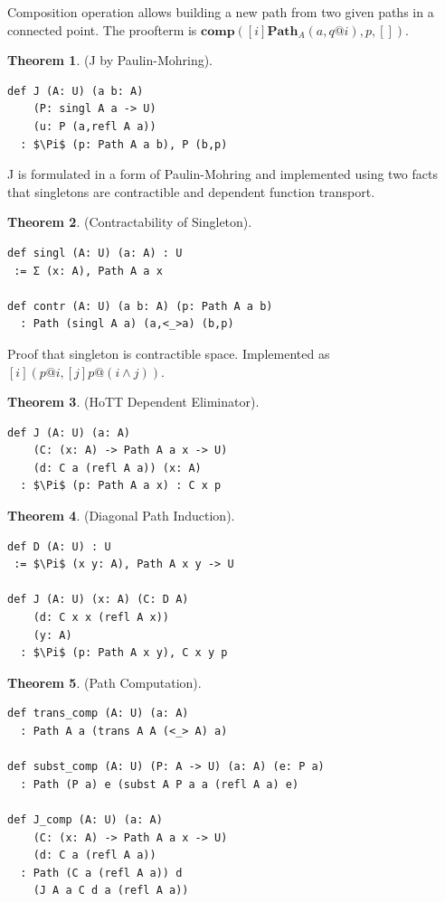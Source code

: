 \documentclass{article}
\theoremstyle{definition}
\newtheorem{theorem}{Theorem}
\begin{document}
Composition operation allows building a new path from two given paths
in a connected point. The proofterm is
$\mathbf{comp}([i] \mathbf{Path}_A(a,q@i),p,[])$.

\begin{theorem} (J by Paulin-Mohring).
\begin{lstlisting}[mathescape=true]
def J (A: U) (a b: A)
    (P: singl A a -> U)
    (u: P (a,refl A a))
  : $\Pi$ (p: Path A a b), P (b,p)
\end{lstlisting}
\end{theorem}

J is formulated in a form of Paulin-Mohring and implemented using
two facts that singletons are contractible and dependent function
transport.

\begin{theorem} (Contractability of Singleton).
\begin{lstlisting}[mathescape=true]
def singl (A: U) (a: A) : U
 := Σ (x: A), Path A a x

def contr (A: U) (a b: A) (p: Path A a b)
  : Path (singl A a) (a,<_>a) (b,p)
\end{lstlisting}
\end{theorem}

Proof that singleton is contractible space. Implemented as $[i] (p @ i, [j] p @ (i \land j))$.

\begin{theorem} (HoTT Dependent Eliminator).
\begin{lstlisting}[mathescape=true]
def J (A: U) (a: A)
    (C: (x: A) -> Path A a x -> U)
    (d: C a (refl A a)) (x: A)
  : $\Pi$ (p: Path A a x) : C x p
\end{lstlisting}
\end{theorem}

\begin{theorem} (Diagonal Path Induction).
\begin{lstlisting}[mathescape=true]
def D (A: U) : U
 := $\Pi$ (x y: A), Path A x y -> U

def J (A: U) (x: A) (C: D A)
    (d: C x x (refl A x))
    (y: A)
  : $\Pi$ (p: Path A x y), C x y p
\end{lstlisting}
\end{theorem}

\newpage
\begin{theorem} (Path Computation).
\begin{lstlisting}[mathescape=true]
def trans_comp (A: U) (a: A)
  : Path A a (trans A A (<_> A) a)

def subst_comp (A: U) (P: A -> U) (a: A) (e: P a)
  : Path (P a) e (subst A P a a (refl A a) e)

def J_comp (A: U) (a: A)
    (C: (x: A) -> Path A a x -> U)
    (d: C a (refl A a))
  : Path (C a (refl A a)) d
    (J A a C d a (refl A a))
\end{lstlisting}
\end{theorem}
\end{document}
